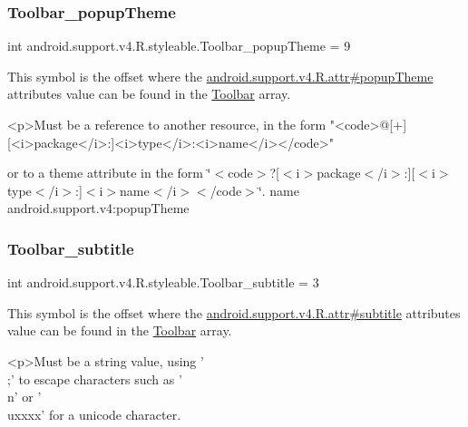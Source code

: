 \subsubsection{\texorpdfstring{Toolbar\+\_\+popup\+Theme}{Toolbar\_popupTheme}}
{\footnotesize\ttfamily int android.\+support.\+v4.\+R.\+styleable.\+Toolbar\+\_\+popup\+Theme = 9\hspace{0.3cm}{\ttfamily [static]}}

This symbol is the offset where the \hyperlink{classandroid_1_1support_1_1v4_1_1R_1_1attr_a05446418402decb6877749b6de8bc2d8}{android.\+support.\+v4.\+R.\+attr\#popup\+Theme} attribute\textquotesingle{}s value can be found in the \hyperlink{classandroid_1_1support_1_1v4_1_1R_1_1styleable_a211358a2f951023c7735caea0fb5ae04}{Toolbar} array.

\begin{DoxyVerb}      <p>Must be a reference to another resource, in the form "<code>@[+][<i>package</i>:]<i>type</i>:<i>name</i></code>"
\end{DoxyVerb}
 or to a theme attribute in the form \char`\"{}$<$code$>$?\mbox{[}$<$i$>$package$<$/i$>$\+:\mbox{]}\mbox{[}$<$i$>$type$<$/i$>$\+:\mbox{]}$<$i$>$name$<$/i$>$$<$/code$>$\char`\"{}.  name android.\+support.\+v4\+:popup\+Theme \mbox{\label{classandroid_1_1support_1_1v4_1_1R_1_1styleable_a56f57151a46ae8da5d66cce8444fc7f4}} 
\subsubsection{\texorpdfstring{Toolbar\+\_\+subtitle}{Toolbar\_subtitle}}
{\footnotesize\ttfamily int android.\+support.\+v4.\+R.\+styleable.\+Toolbar\+\_\+subtitle = 3\hspace{0.3cm}{\ttfamily [static]}}

This symbol is the offset where the \hyperlink{classandroid_1_1support_1_1v4_1_1R_1_1attr_a6a1cb8c7505d353bab12b766346b0219}{android.\+support.\+v4.\+R.\+attr\#subtitle} attribute\textquotesingle{}s value can be found in the \hyperlink{classandroid_1_1support_1_1v4_1_1R_1_1styleable_a211358a2f951023c7735caea0fb5ae04}{Toolbar} array.

\begin{DoxyVerb}      <p>Must be a string value, using '\\;' to escape characters such as '\\n' or '\\uxxxx' for a unicode character.
\end{DoxyVerb}
 

